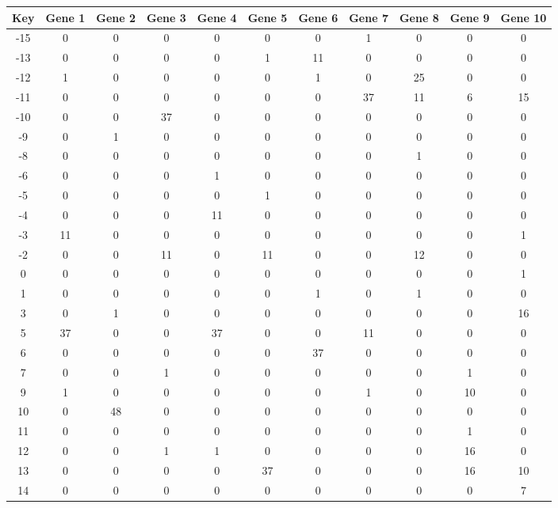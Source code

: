 \begin{tabular}{|c|c|c|c|c|c|c|c|c|c|c|}
\hline
Key & Gene 1 & Gene 2 & Gene 3 & Gene 4 & Gene 5 & Gene 6 & Gene 7 & Gene 8 & Gene 9 & Gene 10 \\
\hline
-15 & 0 & 0 & 0 & 0 & 0 & 0 & 1 & 0 & 0 & 0 \\
-13 & 0 & 0 & 0 & 0 & 1 & 11 & 0 & 0 & 0 & 0 \\
-12 & 1 & 0 & 0 & 0 & 0 & 1 & 0 & 25 & 0 & 0 \\
-11 & 0 & 0 & 0 & 0 & 0 & 0 & 37 & 11 & 6 & 15 \\
-10 & 0 & 0 & 37 & 0 & 0 & 0 & 0 & 0 & 0 & 0 \\
-9 & 0 & 1 & 0 & 0 & 0 & 0 & 0 & 0 & 0 & 0 \\
-8 & 0 & 0 & 0 & 0 & 0 & 0 & 0 & 1 & 0 & 0 \\
-6 & 0 & 0 & 0 & 1 & 0 & 0 & 0 & 0 & 0 & 0 \\
-5 & 0 & 0 & 0 & 0 & 1 & 0 & 0 & 0 & 0 & 0 \\
-4 & 0 & 0 & 0 & 11 & 0 & 0 & 0 & 0 & 0 & 0 \\
-3 & 11 & 0 & 0 & 0 & 0 & 0 & 0 & 0 & 0 & 1 \\
-2 & 0 & 0 & 11 & 0 & 11 & 0 & 0 & 12 & 0 & 0 \\
0 & 0 & 0 & 0 & 0 & 0 & 0 & 0 & 0 & 0 & 1 \\
1 & 0 & 0 & 0 & 0 & 0 & 1 & 0 & 1 & 0 & 0 \\
3 & 0 & 1 & 0 & 0 & 0 & 0 & 0 & 0 & 0 & 16 \\
5 & 37 & 0 & 0 & 37 & 0 & 0 & 11 & 0 & 0 & 0 \\
6 & 0 & 0 & 0 & 0 & 0 & 37 & 0 & 0 & 0 & 0 \\
7 & 0 & 0 & 1 & 0 & 0 & 0 & 0 & 0 & 1 & 0 \\
9 & 1 & 0 & 0 & 0 & 0 & 0 & 1 & 0 & 10 & 0 \\
10 & 0 & 48 & 0 & 0 & 0 & 0 & 0 & 0 & 0 & 0 \\
11 & 0 & 0 & 0 & 0 & 0 & 0 & 0 & 0 & 1 & 0 \\
12 & 0 & 0 & 1 & 1 & 0 & 0 & 0 & 0 & 16 & 0 \\
13 & 0 & 0 & 0 & 0 & 37 & 0 & 0 & 0 & 16 & 10 \\
14 & 0 & 0 & 0 & 0 & 0 & 0 & 0 & 0 & 0 & 7 \\
\hline
\end{tabular}